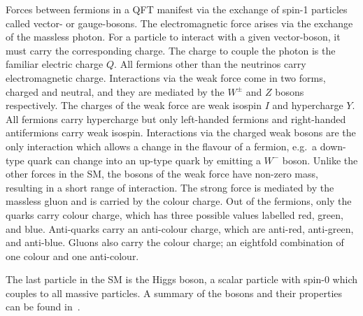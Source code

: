 Forces between fermions in a QFT manifest via the exchange of spin-1 particles called vector- or gauge-bosons.
The electromagnetic force arises via the exchange of the massless photon.
For a particle to interact with a given vector-boson, it must carry the corresponding charge.
The charge to couple the photon is the familiar electric charge $Q$.
All fermions other than the neutrinos carry electromagnetic charge.
Interactions via the weak force come in two forms, charged and neutral, and they are mediated by the $W^\pm$ and $Z$ bosons respectively.
The charges of the weak force are weak isospin $I$ and hypercharge $Y$.
All fermions carry hypercharge but only left-handed fermions and right-handed antifermions carry weak isospin.
Interactions via the charged weak bosons are the only interaction which allows a change in the flavour of a fermion, e.g.\ a down-type quark can change into an up-type quark by emitting a $W^-$ boson.
Unlike the other forces in the SM, the bosons of the weak force have non-zero mass, resulting in a short range of interaction.
The strong force is mediated by the massless gluon and is carried by the colour charge.
Out of the fermions, only the quarks carry colour charge, which has three possible values labelled red, green, and blue.
Anti-quarks carry an anti-colour charge, which are anti-red, anti-green, and anti-blue.
Gluons also carry the colour charge; an eightfold combination of one colour and one anti-colour.

The last particle in the SM is the Higgs boson, a scalar particle with spin-0 which couples to all massive particles.
A summary of the bosons and their properties can be found in~.

